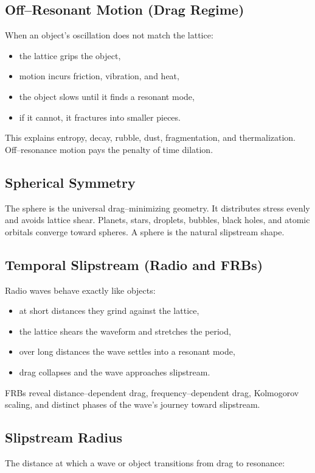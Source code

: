 \documentclass[12pt,oneside]{book}
\begin{document}
\subsection{Off--Resonant Motion (Drag Regime)}
When an object's oscillation does not match the lattice:
\begin{itemize}
    \item the lattice grips the object,
    \item motion incurs friction, vibration, and heat,
    \item the object slows until it finds a resonant mode,
    \item if it cannot, it fractures into smaller pieces.
\end{itemize}
This explains entropy, decay, rubble, dust, fragmentation, and thermalization.  
Off--resonance motion pays the penalty of time dilation.

\subsection{Spherical Symmetry}
The sphere is the universal drag--minimizing geometry.  
It distributes stress evenly and avoids lattice shear.  
Planets, stars, droplets, bubbles, black holes, and atomic orbitals converge toward spheres.  
A sphere is the natural slipstream shape.

\subsection{Temporal Slipstream (Radio and FRBs)}
Radio waves behave exactly like objects:
\begin{itemize}
    \item at short distances they grind against the lattice,
    \item the lattice shears the waveform and stretches the period,
    \item over long distances the wave settles into a resonant mode,
    \item drag collapses and the wave approaches slipstream.
\end{itemize}
FRBs reveal distance--dependent drag, frequency--dependent drag, Kolmogorov scaling, and 
distinct phases of the wave's journey toward slipstream.

\subsection{Slipstream Radius}
The distance at which a wave or object transitions from drag to resonance:
\end{document}
